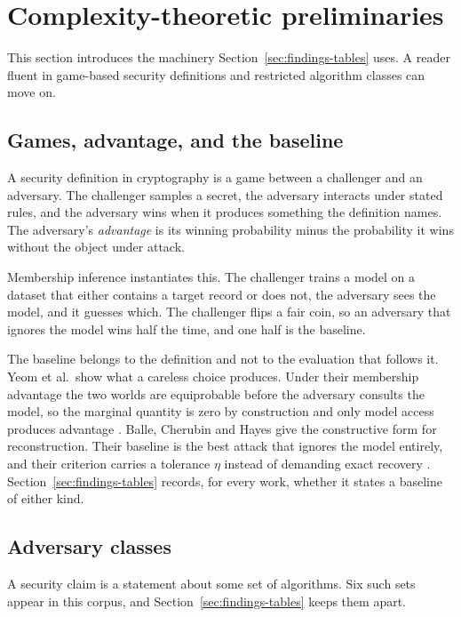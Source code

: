 \section{Complexity-theoretic preliminaries}
\label{sec:prelim}

This section introduces the machinery Section~\ref{sec:findings-tables} uses. A
reader fluent in game-based security definitions and restricted algorithm
classes can move on.

\subsection{Games, advantage, and the baseline}

A security definition in cryptography is a game between a challenger and an
adversary. The challenger samples a secret, the adversary interacts under stated
rules, and the adversary wins when it produces something the definition names.
The adversary's \emph{advantage} is its winning probability minus the
probability it wins without the object under attack.

Membership inference instantiates this. The challenger trains a model on a
dataset that either contains a target record or does not, the adversary sees the
model, and it guesses which. The challenger flips a fair coin, so an adversary
that ignores the model wins half the time, and one half is the baseline.

The baseline belongs to the definition and not to the evaluation that follows
it. Yeom et al.\ show what a careless choice produces. Under their membership
advantage the two worlds are equiprobable before the adversary consults the
model, so the marginal quantity is zero by construction and only model access
produces advantage \cite{YGFJ18}. Balle, Cherubin and Hayes give the
constructive form for reconstruction. Their baseline is the best attack that
ignores the model entirely, and their criterion carries a tolerance $\eta$
instead of demanding exact recovery \cite{BCH22}.
Section~\ref{sec:findings-tables} records, for every work, whether it states a
baseline of either kind.

\subsection{Adversary classes}

A security claim is a statement about some set of algorithms. Six such sets
appear in this corpus, and Section~\ref{sec:findings-tables} keeps them apart.

